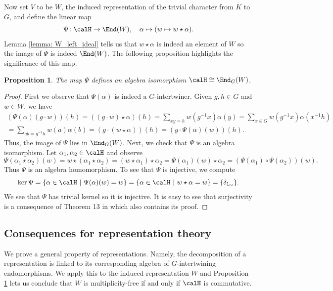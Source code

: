 \documentclass[11pt]{amsart}
\newtheorem{prop}[thm]{Proposition}
\theoremstyle{remark}
\begin{document}
Now set $V$ to be $W$, the induced representation of the trivial character from $K$ to $G$, and define the linear map
\[
	\Psi\colon \calH\to\End(W),\quad \alpha\mapsto(w\mapsto w\star\alpha).
\]
Lemma \ref{lemma: W_left_ideal} tells us that $w \star\alpha$ is indeed an element of $W$ so the image of $\Psi$ is indeed $\End(W)$.
The following proposition highlights the significance of this map.
\begin{prop}\label{prop: H_iso_End_G(W)}
	The map $\Psi$ defines an algebra isomorphism $\calH \cong \End_G(W)$.
\end{prop}
\begin{proof}
	First we observe that $\Psi(\alpha)$ is indeed a $G$-intertwiner.
	Given $g,h\in G$ and $w\in W$, we have
	\begin{multline*}
		(\Psi(\alpha)(g\cdot w))(h) = ((g\cdot w)\star\alpha)(h) = \sum_{xy=h} w(g^{-1}x)\alpha(y) = \sum_{x\in G} w(g^{-1}x)\alpha(x^{-1}h) \\
		= \sum_{ab=g^{-1}h} w(a)\alpha(b) = (g\cdot(w\star\alpha))(h) = (g\cdot \Psi(\alpha)(w))(h).
	\end{multline*}
	Thus, the image of $\Psi$ lies in $\End_G(W)$.
	Next, we check that $\Psi$ is an algebra isomorphism.
	Let $\alpha_1,\alpha_2\in\calH$ and observe
	\[
		\Psi(\alpha_1\star\alpha_2)(w) = w\star(\alpha_1\star\alpha_2) = (w\star\alpha_1)\star\alpha_2 = \Psi(\alpha_1)(w)\star\alpha_2 = (\Psi(\alpha_1)\circ\Psi(\alpha_2))(w).
	\]
	Thus $\Psi$ is an algebra homomorphism.
	To see that $\Psi$ is injective, we compute
	\[
		\ker \Psi = \{\alpha\in\calH\ |\ \Psi(\alpha)(w) = w\} = \{\alpha\in\calH\ |\ w\star\alpha = w\} = \{\delta_{1_G}\}.
	\]
	We see that $\Psi$ has trivial kernel so it is injective.
	It is easy to see that surjectivity is a consequence of Theorem 13 in \cite{Murnaghan05} which also contains its proof.
\end{proof}


\subsection{Consequences for representation theory}\label{Section1.6}
We prove a general property of representations.
Namely, the decomposition of a representation is linked to its corresponding algebra of $G$-intertwining endomorphisms.
We apply this to the induced representation $W$ and Proposition \ref{prop: H_iso_End_G(W)} lets us conclude that $W$ is multiplicity-free if and only if $\calH$ is commutative.
\end{document}
